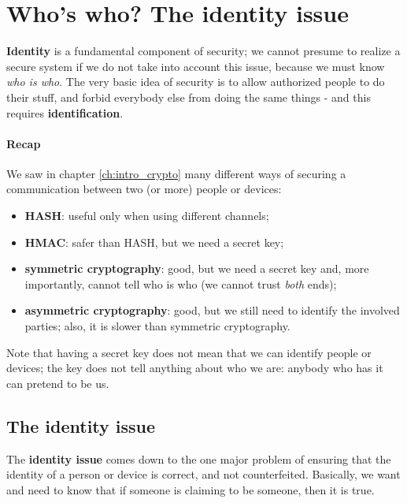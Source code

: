 \chapter[The identity issue]{Who's who? The identity issue}
\label{ch:identity}
\textbf{Identity} is a fundamental component of security; we cannot presume to realize a secure system if we do not take into account this issue, because we must know \textit{who is who}. The very basic idea of security is to allow authorized people to do their stuff, and forbid everybody else from doing the same things - and this requires \textbf{identification}.


\subsubsection*{Recap}
We saw in chapter \ref{ch:intro_crypto} many different ways of securing a communication between two (or more) people or devices:

\begin{itemize}
    \item \textbf{HASH}: useful only when using different channels;
    \item \textbf{HMAC}: safer than HASH, but we need a secret key;
    \item \textbf{symmetric cryptography}: good, but we need a secret key and, more importantly, cannot tell who is who (we cannot trust \textit{both} ends);
    \item \textbf{asymmetric cryptography}: good, but we still need to identify the involved parties; also, it is slower than symmetric cryptography.
\end{itemize}

Note that having a secret key does not mean that we can identify people or devices; the key does not tell anything about who we are: anybody who has it can pretend to be us.


\section{The identity issue}
The \textbf{identity issue} comes down to the one major problem of ensuring that the identity of a person or device is correct, and not counterfeited. Basically, we want and need to know that if someone is claiming to be someone, then it is true.

